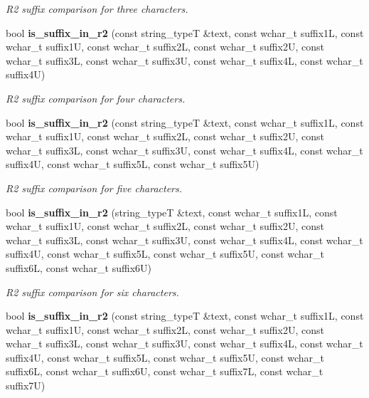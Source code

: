 \begin{DoxyCompactItemize}
\begin{DoxyCompactList}\small\item\em R2 suffix comparison for three characters. \end{DoxyCompactList}\item 
bool {\bf is\+\_\+suffix\+\_\+in\+\_\+r2} (const string\+\_\+typeT \&text, const wchar\+\_\+t suffix1L, const wchar\+\_\+t suffix1U, const wchar\+\_\+t suffix2L, const wchar\+\_\+t suffix2U, const wchar\+\_\+t suffix3L, const wchar\+\_\+t suffix3U, const wchar\+\_\+t suffix4L, const wchar\+\_\+t suffix4U)\label{classstemming_1_1stem_ac12e9f11d41f69e71c7379387c4564b9}

\begin{DoxyCompactList}\small\item\em R2 suffix comparison for four characters. \end{DoxyCompactList}\item 
bool {\bf is\+\_\+suffix\+\_\+in\+\_\+r2} (const string\+\_\+typeT \&text, const wchar\+\_\+t suffix1L, const wchar\+\_\+t suffix1U, const wchar\+\_\+t suffix2L, const wchar\+\_\+t suffix2U, const wchar\+\_\+t suffix3L, const wchar\+\_\+t suffix3U, const wchar\+\_\+t suffix4L, const wchar\+\_\+t suffix4U, const wchar\+\_\+t suffix5L, const wchar\+\_\+t suffix5U)\label{classstemming_1_1stem_aca8fba0d6b27d8da969508adc281cfa5}

\begin{DoxyCompactList}\small\item\em R2 suffix comparison for five characters. \end{DoxyCompactList}\item 
bool {\bf is\+\_\+suffix\+\_\+in\+\_\+r2} (string\+\_\+typeT \&text, const wchar\+\_\+t suffix1L, const wchar\+\_\+t suffix1U, const wchar\+\_\+t suffix2L, const wchar\+\_\+t suffix2U, const wchar\+\_\+t suffix3L, const wchar\+\_\+t suffix3U, const wchar\+\_\+t suffix4L, const wchar\+\_\+t suffix4U, const wchar\+\_\+t suffix5L, const wchar\+\_\+t suffix5U, const wchar\+\_\+t suffix6L, const wchar\+\_\+t suffix6U)\label{classstemming_1_1stem_ad85a9757083c5fcbd6300367df2a648b}

\begin{DoxyCompactList}\small\item\em R2 suffix comparison for six characters. \end{DoxyCompactList}\item 
bool {\bf is\+\_\+suffix\+\_\+in\+\_\+r2} (const string\+\_\+typeT \&text, const wchar\+\_\+t suffix1L, const wchar\+\_\+t suffix1U, const wchar\+\_\+t suffix2L, const wchar\+\_\+t suffix2U, const wchar\+\_\+t suffix3L, const wchar\+\_\+t suffix3U, const wchar\+\_\+t suffix4L, const wchar\+\_\+t suffix4U, const wchar\+\_\+t suffix5L, const wchar\+\_\+t suffix5U, const wchar\+\_\+t suffix6L, const wchar\+\_\+t suffix6U, const wchar\+\_\+t suffix7L, const wchar\+\_\+t suffix7U)\label{classstemming_1_1stem_a65e9882d17885e66208840b277fcee2e}


\end{DoxyCompactItemize}
